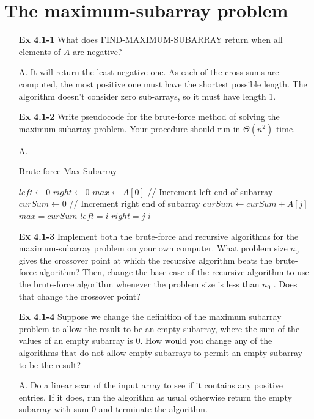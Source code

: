 \documentclass[fontsize=12pt,paper=a4]{book}
\newcommand{\To}{\ \textbf{to}\ }
\renewcommand{\Comment}[1]{// #1}
\begin{document}
\section{The maximum-subarray problem}
\begin{enumerate}
 \item[\textbf{Ex 4.1-1}]
       What does FIND-MAXIMUM-SUBARRAY return when all elements of $A$ are negative?
 \item[A.]
       It will return the least negative one. As each of the cross sums are computed, the most positive one must have the shortest possible length. The algorithm doesn’t consider zero sub-arrays, so it must have length 1.
       
 \item[\textbf{Ex 4.1-2}]
       Write pseudocode for the brute-force method of solving the maximum subarray problem. Your procedure should run in $\Theta(n^2)$ time.
 \item[A.]
       \begin{algorithm}
        \caption{Brute-force Max Subarray}
        \begin{algorithmic}
         \State $left \gets 0$
         \State $right \gets 0$
         \State $max \gets A[0]$
         \Comment{Increment left end of subarray}
         \For{$i \gets 0 \To n-1$}
         \State $curSum \gets 0$
         \Comment{Increment right end of subarray}
         \For{$j \gets i \To n-1$}
         \State $curSum \gets curSum + A[j]$
         \State $max = curSum$
         \State $left = i$
         \State $right = j$
         \EndIf
         \EndFor
         \EndFor
         \State \Return $i$
         \EndProcedure
        \end{algorithmic}
       \end{algorithm}
       
 \item[\textbf{Ex 4.1-3}]
       Implement both the brute-force and recursive algorithms for the maximum-subarray problem on your own computer. What problem size $n_0$ gives the crossover point at which the recursive algorithm beats the brute-force algorithm? Then, change the base case of the recursive algorithm to use the brute-force algorithm whenever the problem size is less than $n_0$ . Does that change the crossover point?
       
 \item[\textbf{Ex 4.1-4}]
       Suppose we change the definition of the maximum subarray problem to allow the result to be an empty subarray, where the sum of the values of an empty subarray is 0. How would you change any of the algorithms that do not allow empty subarrays to permit an empty subarray to be the result?
 \item[A.]
       Do a linear scan of the input array to see if it contains any positive entries. If it does, run the algorithm as usual otherwise return the empty subarray with sum 0 and terminate the algorithm.
       

\end{enumerate}
\end{document}
